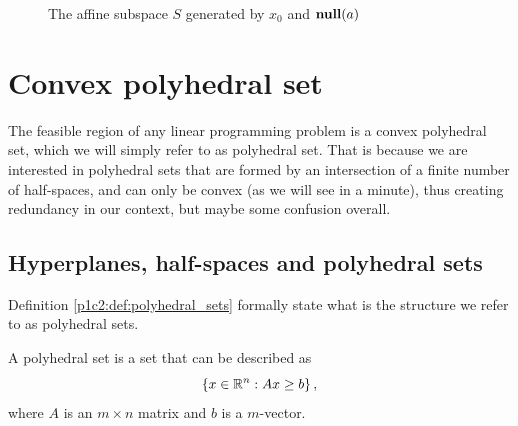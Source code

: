 \begin{figure}
	\caption{The affine subspace $S$ generated by $x_0$ and $\mathop{\bf null}(a)$} \label{p1c2:fig:nill_space_a}		
\end{figure}


\section{Convex polyhedral set}

The feasible region of any linear programming problem is a convex polyhedral set, which we will simply refer to as polyhedral set. That is because we are interested in polyhedral sets that are formed by an intersection of a finite number of half-spaces, and can only be convex (as we will see in a minute), thus creating redundancy in our context, but maybe some confusion overall. 

\subsection{Hyperplanes, half-spaces and polyhedral sets}

Definition \ref{p1c2:def:polyhedral_sets} formally state what is the structure we refer to as polyhedral sets.

\begin{definition} \label{p1c2:def:polyhedral_sets}
	A polyhedral set is a set that can be described as
	$$
	\left\{ x \in \mathbb{R}^n : Ax \geq b \right \},	
	$$
	where $A$ is an $m \times n$ matrix and $b$ is a $m$-vector.
\end{definition}



 


